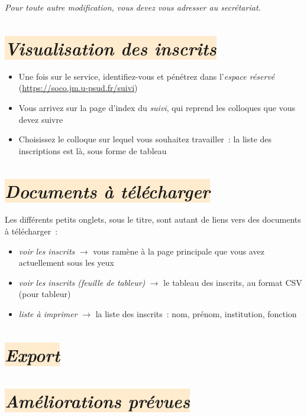 \documentclass[10pt,a4paper]{article}
\newcommand{\rosepale}[1]{\colorbox{BlanchedAlmond}{#1}}
\begin{document}
\emph{Pour toute autre modification, vous devez vous adresser au secrétariat.}

\section*{\rosepale{\emph{Visualisation des inscrits}}}

\begin{itemize}
  \item Une fois sur le service, identifiez-vous et pénétrez dans l'\emph{espace réservé} (\url{https://soco.jm.u-psud.fr/suivi})
  \item Vous arrivez sur la page d'index du \emph{suivi}, qui reprend les colloques que vous devez suivre
  \item Choisissez le colloque sur lequel vous souhaitez travailler : la liste des inscriptions est là, sous forme de tableau
\end{itemize}


\section*{\rosepale{\emph{Documents à télécharger}}}

Les différents petits onglets, sous le titre, sont autant de liens vers des
documents à télécharger :

\begin{itemize}
  \item \emph{voir les inscrits} $\longrightarrow$ vous ramène à la page
    principale que vous avez actuellement sous les yeux
  \item \emph{voir les inscrits (feuille de tableur)} $\longrightarrow$ le tableau des inscrits, au format CSV (pour tableur)
  \item \emph{liste à imprimer} $\longrightarrow$ la liste des inscrits : nom, prénom, institution, fonction
\end{itemize}

\section*{\rosepale{\emph{Export}}}

\section*{\rosepale{\emph{Améliorations prévues}}}
\end{document}
